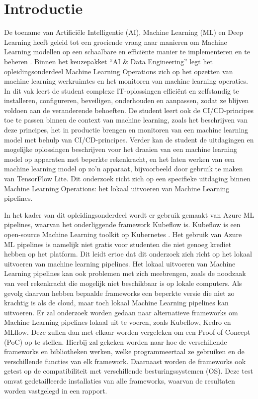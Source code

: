 
\section{Introductie}%
\label{sec:introductie}

De toename van Artificiële Intelligentie (AI), Machine Learning (ML) en Deep Learning heeft geleid tot een groeiende vraag naar manieren om Machine Learning modellen op een schaalbare en efficiënte manier te implementeren en te beheren \autocite{Aggarwal2022}.
Binnen het keuzepakket ``AI \& Data Engineering'' legt het opleidingsonderdeel Machine Learning Operations zich op het opzetten van machine learning werkruimtes en het monitoren van machine learning operaties. In dit vak leert de student complexe IT-oplossingen efficiënt en zelfstandig te installeren, configureren, beveiligen, onderhouden en aanpassen, zodat ze blijven voldoen aan de veranderende behoeften. De student leert ook de CI/CD-principes toe te passen binnen de context van machine learning, zoals het beschrijven van deze principes, het in productie brengen en monitoren van een machine learning model met behulp van CI/CD-principes. Verder kan de student de uitdagingen en mogelijke oplossingen beschrijven voor het draaien van een machine learning model op apparaten met beperkte rekenkracht, en het laten werken van een machine learning model op zo'n apparaat, bijvoorbeeld door gebruik te maken van TensorFlow Lite.
Dit onderzoek richt zich op een specifieke uitdaging binnen Machine Learning Operations: het lokaal uitvoeren van Machine Learning pipelines.

In het kader van dit opleidingsonderdeel wordt er gebruik gemaakt van Azure ML pipelines, waarvan het onderliggende framework Kubeflow is. Kubeflow is een open-source Machine Learning toolkit op Kubernetes \autocite{Kubeflow2021}.
Het gebruik van Azure ML pipelines is namelijk niet gratis voor studenten die niet genoeg krediet hebben op het platform. Dit leidt ertoe dat dit onderzoek zich richt op het lokaal uitvoeren van machine learning pipelines.
Het lokaal uitvoeren van Machine Learning pipelines kan ook problemen met zich meebrengen, zoals de noodzaak van veel rekenkracht die mogelijk niet beschikbaar is op lokale computers. Als gevolg daarvan hebben bepaalde frameworks een beperkte versie die niet zo krachtig is als de cloud, maar toch lokaal Machine Learning pipelines kan uitvoeren.
Er zal onderzoek worden gedaan naar alternatieve frameworks om Machine Learning pipelines lokaal uit te voeren, zoals Kubeflow, Kedro en MLflow. Deze zullen dan met elkaar worden vergeleken om een Proof of Concept (PoC) op te stellen. Hierbij zal gekeken worden naar hoe de verschillende frameworks en bibliotheken werken, welke programmeertaal ze gebruiken en de verschillende functies van elk framework.
Daarnaast worden de frameworks ook getest op de compatibiliteit met verschillende besturingssystemen (OS). Deze test omvat gedetailleerde installaties van alle frameworks, waarvan de resultaten worden vastgelegd in een rapport.\newline

